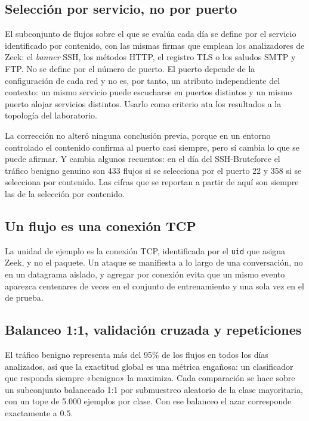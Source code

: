 \subsection*{Selección por servicio, no por puerto}

El subconjunto de flujos sobre el que se evalúa cada día se define por el
servicio identificado por contenido, con las mismas firmas que emplean los
analizadores de Zeek: el \emph{banner} SSH, los métodos HTTP, el registro TLS o
los saludos SMTP y FTP. No se define por el número de puerto. El puerto depende
de la configuración de cada red y no es, por tanto, un atributo independiente
del contexto: un mismo servicio puede escucharse en puertos distintos y un mismo
puerto alojar servicios distintos. Usarlo como criterio ata los resultados a la
topología del laboratorio.

La corrección no alteró ninguna conclusión previa, porque en un entorno
controlado el contenido confirma al puerto casi siempre, pero sí cambia lo que
se puede afirmar. Y cambia algunos recuentos: en el día del SSH-Bruteforce el
tráfico benigno genuino son 433 flujos si se selecciona por el puerto 22 y 358
si se selecciona por contenido. Las cifras que se reportan a partir de aquí son
siempre las de la selección por contenido.

\subsection*{Un flujo es una conexión TCP}

La unidad de ejemplo es la conexión TCP, identificada por el \texttt{uid} que
asigna Zeek, y no el paquete. Un ataque se manifiesta a lo largo de una
conversación, no en un datagrama aislado, y agregar por conexión evita que un
mismo evento aparezca centenares de veces en el conjunto de entrenamiento y una
sola vez en el de prueba.

\subsection*{Balanceo 1:1, validación cruzada y repeticiones}

El tráfico benigno representa más del 95\% de los flujos en todos los días
analizados, así que la exactitud global es una métrica engañosa: un
clasificador que responda siempre «benigno» la maximiza. Cada comparación se
hace sobre un subconjunto balanceado 1:1 por submuestreo aleatorio de la clase
mayoritaria, con un tope de 5.000 ejemplos por clase. Con ese balanceo el azar
corresponde exactamente a $0.5$.

